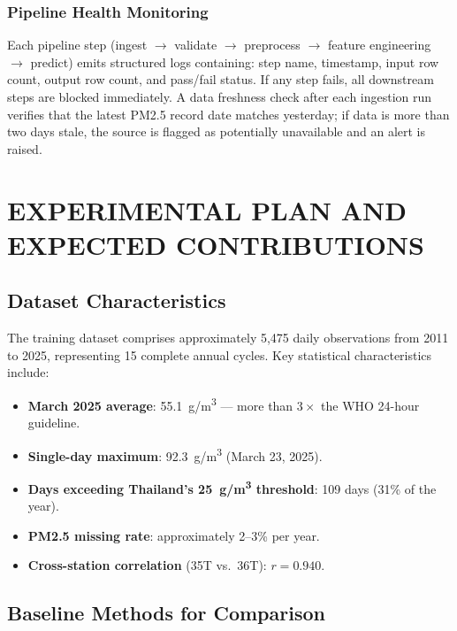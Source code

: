 \documentclass[12pt,a4paper]{report}
\begin{document}
\subsection{Pipeline Health Monitoring}

Each pipeline step (ingest $\to$ validate $\to$ preprocess $\to$ feature engineering $\to$ predict) emits structured logs containing: step name, timestamp, input row count, output row count, and pass/fail status. If any step fails, all downstream steps are blocked immediately. A data freshness check after each ingestion run verifies that the latest PM2.5 record date matches yesterday; if data is more than two days stale, the source is flagged as potentially unavailable and an alert is raised.

\chapter{EXPERIMENTAL PLAN AND EXPECTED CONTRIBUTIONS}

\section{Dataset Characteristics}

The training dataset comprises approximately 5,475 daily observations from 2011 to 2025, representing 15 complete annual cycles. Key statistical characteristics include:

\begin{itemize}
  \item \textbf{March 2025 average}: 55.1~\textmu g/m\textsuperscript{3} --- more than $3\times$ the WHO 24-hour guideline.
  \item \textbf{Single-day maximum}: 92.3~\textmu g/m\textsuperscript{3} (March 23, 2025).
  \item \textbf{Days exceeding Thailand's 25~\textmu g/m\textsuperscript{3} threshold}: 109 days (31\% of the year).
  \item \textbf{PM2.5 missing rate}: approximately 2--3\% per year.
  \item \textbf{Cross-station correlation} (35T vs.\ 36T): $r = 0.940$.
\end{itemize}

\section{Baseline Methods for Comparison}
\end{document}
